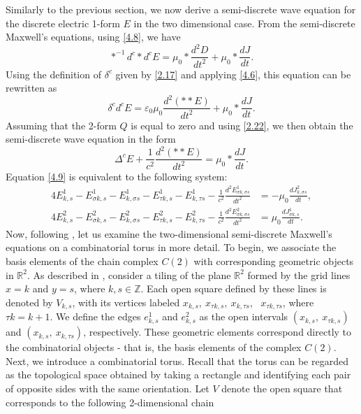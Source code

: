 \documentclass[english]{article}
\theoremstyle{plain}
\theoremstyle{definition}
\theoremstyle{remark}
\numberwithin{equation}{section}
\begin{document}
Similarly to the previous section, we now derive a semi-discrete wave equation for the discrete electric 1-form $E$ in the two dimensional case.
From the semi-discrete Maxwell's equations, using \eqref{4.8},  we have
\begin{equation*}
  \ast^{-1}d^c\ast d^c E=\mu_0\ast\frac{d^2D}{dt^2}+\mu_0\ast\frac{dJ}{dt}.
 \end{equation*}
Using the definition of $\delta^c$ given by \eqref{2.17} and applying \eqref{4.6}, this equation can be rewritten as
 \begin{equation*}
  \delta^cd^c E=\varepsilon_0\mu_0\frac{d^2(\ast\ast E)}{dt^2}+\mu_0\ast\frac{dJ}{dt}.
 \end{equation*}
 Assuming that the 2-form $Q$ is equal to zero and using \eqref{2.22}, we then obtain the semi-discrete wave equation in the form
\begin{equation}\label{4.9}
  \Delta^cE+\frac{1}{c^2}\frac{d^2(\ast\ast E)}{dt^2}=\mu_0\ast\frac{dJ}{dt}.
 \end{equation}
 Equation \eqref{4.9} is equivalent to the following system:
 \begin{align*}\label{}
4E^1_{k,s}-E^1_{\sigma k,s}-E^1_{k,\sigma s}-E^1_{\tau k,s}-E^1_{k,\tau s}-\frac{1}{c^2}\frac{d^2E^1_{\sigma k, \sigma s}}{dt^2}
&=-\mu_0\frac{dJ^2_{k,\sigma s}}{dt},\\
4E^2_{k,s}-E^2_{\sigma k,s}-E^2_{k,\sigma s}-E^2_{\tau k,s}-E^2_{k,\tau s}-\frac{1}{c^2}\frac{d^2E^2_{\sigma k, \sigma s}}{dt^2}
&=\mu_0\frac{dJ^1_{\sigma k, s}}{dt}.
\end{align*}
Now, following \cite{S5}, let us examine the two-dimensional semi-discrete Maxwell's equations on a combinatorial torus in more detail.
To begin, we associate the basis elements of the chain complex $C(2)$ with corresponding geometric objects in $\mathbb{R}^2$. As described in \cite{S5}, consider a tiling of the plane $\mathbb{R}^2$  formed by the grid lines
$x=k$ and $y=s$, where $k,s\in\mathbb{Z}$. Each open square defined by these lines is denoted by
$V_{k,s}$, with its vertices labeled $x_{k,s}, \ x_{\tau k,s}, \ x_{k,\tau s}$, \ $x_{\tau k, \tau s}$, where $\tau k=k+1$. We define the edges
$e_{k,s}^1$ and $e_{k,s}^2$ as the open intervals  $(x_{k,s}, \ x_{\tau k,s})$ and $(x_{k,s}, \ x_{k, \tau s})$, respectively.
These geometric elements correspond directly to the combinatorial objects - that is, the basis elements of the complex $C(2)$. Next, we introduce a combinatorial torus. Recall that the torus can be regarded as the topological space obtained by taking a rectangle and identifying each pair of opposite sides with the same orientation. Let  $V$  denote the open square that corresponds to the following 2-dimensional chain
\end{document}
